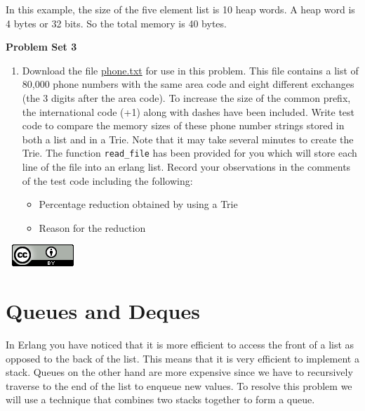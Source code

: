 \documentclass[
]{book}
\providecommand{\tightlist}{%
  \setlength{\itemsep}{0pt}\setlength{\parskip}{0pt}}
\begin{document}
In this example, the size of the five element list is 10 heap words. A heap word is 4 bytes or 32 bits. So the total memory is 40 bytes.

\begin{problembox}

\textbf{Problem Set 3}

\begin{enumerate}
\def\labelenumi{\arabic{enumi}.}
\tightlist
\item
  Download the file \href{proves/phone.txt}{phone.txt} for use in this problem. This file contains a list of 80,000 phone numbers with the same area code and eight different exchanges (the 3 digits after the area code). To increase the size of the common prefix, the international code (+1) along with dashes have been included. Write test code to compare the memory sizes of these phone number strings stored in both a list and in a Trie. Note that it may take several minutes to create the Trie. The function \texttt{read\_file} has been provided for you which will store each line of the file into an erlang list. Record your observations in the comments of the test code including the following:

  \begin{itemize}
  \tightlist
  \item
    Percentage reduction obtained by using a Trie
  \item
    Reason for the reduction
  \end{itemize}
\end{enumerate}

\end{problembox}

\(\nonumber\)
\(\nonumber\)
\href{http://creativecommons.org/licenses/by/4.0/}{\includegraphics{images/cc-88x31.png}}

\hypertarget{queues-and-deques}{%
\chapter{Queues and Deques}\label{queues-and-deques}}

In Erlang you have noticed that it is more efficient to access the front of a list as opposed to the back of the list. This means that it is very efficient to implement a stack. Queues on the other hand are more expensive since we have to recursively traverse to the end of the list to enqueue new values. To resolve this problem we will use a technique that combines two stacks together to form a queue.
\end{document}
